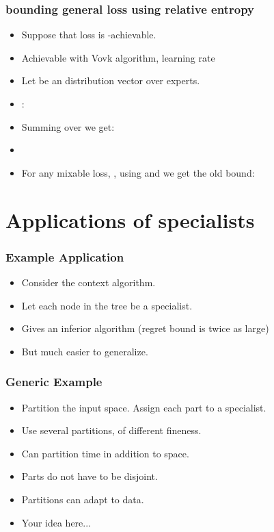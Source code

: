\documentclass[handout]{beamer}
\begin{document}
\begin{frame}
\frametitle{bounding general loss using relative entropy}

\begin{itemize}
\item Suppose that loss is -achievable. 
\item Achievable with Vovk algorithm, learning rate 
\item Let \R{$\vu$} be an  distribution vector over experts.
\item {}:
\item Summing over  we get:
\item
{}
\item For any mixable loss, , using  and  we get the old bound:
\end{itemize}
\end{frame}

\section{Applications of specialists}

\begin{frame}
\frametitle{Example Application}
\begin{itemize}
\item Consider the context algorithm.
\item Let each node in the tree be a specialist.
\item Gives an inferior algorithm (regret bound is twice as large)
\item But much easier to generalize.
\end{itemize}
\end{frame}

\begin{frame}
\frametitle{Generic Example}
\begin{itemize}
\item Partition the input space. Assign each part to a specialist.
\item Use several partitions, of different fineness.
\item Can partition time in addition to space.
\item Parts do not have to be disjoint.
\item Partitions can adapt to data.
\item Your idea here...
\end{itemize}

\end{frame}

%
\end{document}
